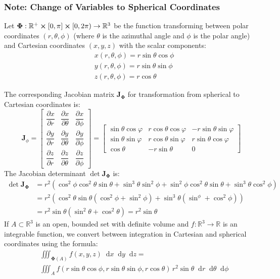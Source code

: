 \documentclass[11pt, a4paper]{article}
\newcommand{\diff}{\mathop{}\!\mathrm{d}} %
\begin{document}
	
\subsubsection{Note: Change of Variables to Spherical Coordinates}
Let $ \bm{\Phi} : \mathbb{R}^+ \cross [0, \pi] \cross [0, 2\pi) \rightarrow \mathbb{R}^3 $ be the function transforming between polar coordinates $ (r, \theta, \phi) $ (where $ \theta  $ is the azimuthal angle and $ \phi $ is the polar angle) and Cartesian coordinates $ (x, y, z) $ with the scalar components:
\begin{align*}
	& x(r, \theta, \phi) = r \sin \theta \cos \phi\\
	& y(r, \theta, \phi) = r \sin \theta \sin \phi \\
	& z(r, \theta, \phi) = r \cos \theta
\end{align*}

The corresponding Jacobian matrix $ \mathbf{J}_{\bm{\Phi}} $ for transformation from spherical to Cartesian coordinates is:
\[
\mathbf{J}_{\phi} = 
\begin{bmatrix}
	\dfrac{\partial x}{\partial r} & \dfrac{\partial x}{\partial \theta} & \dfrac{\partial x}{\partial \phi}\\[2.0ex]
	\dfrac{\partial y}{\partial r} & \dfrac{\partial y}{\partial \theta} & \dfrac{\partial y}{\partial \phi}\\[2.0ex]
	\dfrac{\partial z}{\partial r} & \dfrac{\partial z}{\partial \theta} & \dfrac{\partial z}{\partial \phi} 
\end{bmatrix} = 
\begin{bmatrix}
	\sin \theta \cos \varphi & r \cos \theta \cos \varphi & - r \sin \theta \sin \varphi \\
	\sin \theta \sin \varphi & r \cos \theta \sin \varphi & r \sin \theta \cos \varphi \\
	\cos \theta & - r \sin \theta & 0
\end{bmatrix}
\]
The Jacobian determinant $ \det \mathbf{J}_{\bm{\Phi}} $ is:
\begin{align*}
	\det \mathbf{J}_{\bm{\Phi}} &= r^2(\cos^2 \phi \cos^2 \theta \sin \theta + \sin^3\theta \sin^2 \phi + \sin^2 \phi \cos^2\theta \sin \theta + \sin^3 \theta \cos^2 \phi) \\[1.5ex]
	& = r^2\left(\cos^2\theta \sin \theta (\cos^2 \phi 	+ \sin^2  \phi) + \sin^3 \theta (\sin^\phi + \cos^2\phi)\right) \\[1.5ex]
	& = r^2 \sin \theta (\sin^2 \theta + \cos^2 \theta) = r^2 \sin \theta
\end{align*}
If $ A \subset \mathbb{R}^3 $ is an open, bounded set with definite volume and $ f : \mathbb{R}^3 \rightarrow \mathbb{R}  $ is an integrable function, we convert between integration in Cartesian and spherical coordinates using the formula:
\begin{align*}
	& \iiint_{\bm{\Phi}(A)} f(x, y, z) \diff x \diff y 	\diff z = \\[1.5ex]
	&\iiint_{A}f\left(r \sin \theta \cos \phi, r \sin \theta \sin \phi, r \cos \theta \right)\, r^2 \sin \theta \diff r \diff \theta \diff \phi
\end{align*}
	
\end{document}
